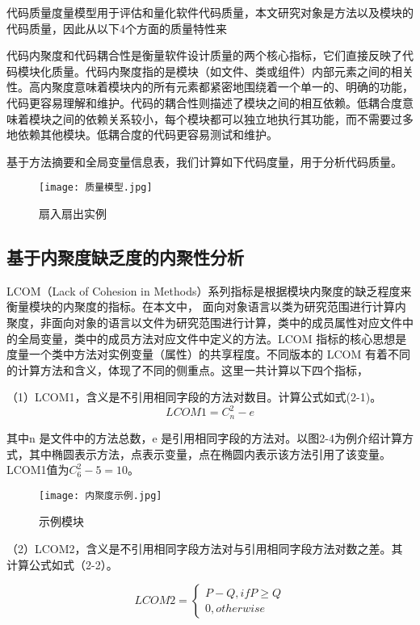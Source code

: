 代码质量度量模型用于评估和量化软件代码质量，本文研究对象是方法以及模块的代码质量，因此从以下4个方面的质量特性来

代码内聚度和代码耦合性是衡量软件设计质量的两个核心指标，它们直接反映了代
码模块化质量。代码内聚度指的是模块（如文件、类或组件）内部元素之间的相关性。高内聚度意味着模块内的所有元素都紧密地围绕着一个单一的、明确的功能，代码更容易理解和维护\cite{2014Service}。代码的耦合性则描述了模块之间的相互依赖。低耦合度意味着模块之间的依赖关系较小，每个模块都可以独立地执行其功能，而不需要过多地依赖其他模块。低耦合度的代码更容易测试和维护\cite{2013Ahe}。


基于方法摘要和全局变量信息表，我们计算如下代码度量，用于分析代码质量。

\begin{figure}[h]
\centering
\texttt{[image: 质量模型.jpg]}
\caption{扇入扇出实例}
\end{figure}


\subsection{基于内聚度缺乏度的内聚性分析}

LCOM（Lack of Cohesion in Methods）系列指标是根据模块内聚度的缺乏程度来衡量模块的内聚度的指标。在本文中，
面向对象语言以类为研究范围进行计算内聚度，非面向对象的语言以文件为研究范围进行计算，类中的成员属性对应文件中的全局变量，类中的成员方法对应文件中定义的方法。LCOM 指标的核心思想是度量一个类中方法对实例变量（属性）的共享程度。不同版本的 LCOM 有着不同的计算方法和含义，体现了不同的侧重点。这里一共计算以下四个指标，

（1）LCOM1，含义是不引用相同字段的方法对数目\cite{1994Ametr}。计算公式如式(2-1)。
\begin{equation}
LCOM1 = C_{n}^{2}-e
\end{equation}

其中n 是文件中的方法总数，e 是引用相同字段的方法对。以图2-4为例介绍计算方式，其中椭圆表示方法，点表示变量，点在椭圆内表示该方法引用了该变量。LCOM1值为\(C_{6}^{2} - 5 = 10\)。

\begin{figure}[h]
\centering
\texttt{[image: 内聚度示例.jpg]}
\caption{示例模块}
\end{figure}
    

（2）LCOM2，含义是不引用相同字段方法对与引用相同字段方法对数之差\cite{1996Coupling}。其计算公式如式（2-2）。

\begin{equation}
    {LCOM2}=\left\{
        \begin{array}
        {c}P-Q,  ifP\geq Q \\
        0,  otherwise
        \end{array}\right.
\end{equation}


